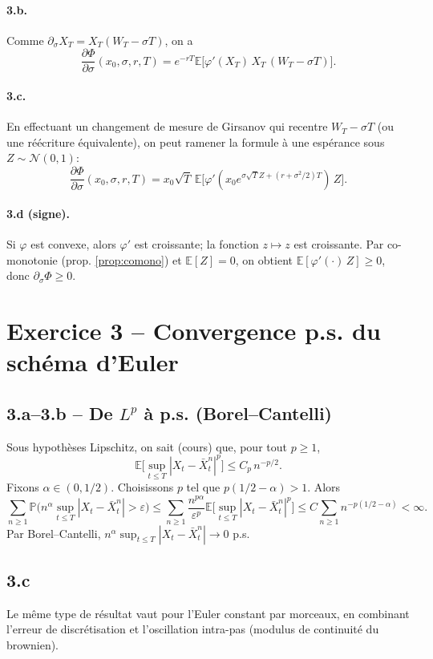 \documentclass[11pt,a4paper]{article}
\newcommand{\E}{\mathbb{E}}
\newcommand{\Pp}{\mathbb{P}}
\newcommand{\1}{\mathbbm{1}}
\theoremstyle{plain}
\theoremstyle{definition}
\begin{document}
\paragraph{3.b.}
Comme $\partial_\sigma X_T=X_T(W_T-\sigma T)$, on a
\[
\frac{\partial\Phi}{\partial\sigma}(x_0,\sigma,r,T)=e^{-rT}\E\big[\varphi'(X_T)\,X_T\,(W_T-\sigma T)\big].
\]
\paragraph{3.c.}
En effectuant un changement de mesure de Girsanov qui recentre $W_T-\sigma T$ (ou une réécriture équivalente), on peut ramener la formule à une espérance sous $Z\sim\mathcal N(0,1)$:
\[
\frac{\partial\Phi}{\partial\sigma}(x_0,\sigma,r,T)=x_0\sqrt{T}\,\E\big[\varphi'(x_0e^{\sigma\sqrt{T}Z+(r+\sigma^2/2)T})\,Z\big].
\]
\paragraph{3.d (signe).}
Si $\varphi$ est convexe, alors $\varphi'$ est croissante; la fonction $z\mapsto z$ est croissante.
Par co-monotonie (prop. \ref{prop:comono}) et $\E[Z]=0$, on obtient $\E[\varphi'(\cdot)\,Z]\ge 0$, donc \(\partial_\sigma\Phi\ge 0\).

\section{Exercice 3 -- Convergence p.s. du schéma d'Euler}
\subsection{3.a--3.b -- De $L^p$ à p.s. (Borel--Cantelli)}
Sous hypothèses Lipschitz, on sait (cours) que, pour tout $p\ge 1$,
\[
\E\Big[\sup_{t\le T}|X_t-\bar X_t^n|^p\Big]\le C_p\,n^{-p/2}.
\]
Fixons $\alpha\in(0,1/2)$. Choisissons $p$ tel que $p(1/2-\alpha)>1$. Alors
\[
\sum_{n\ge 1}\Pp\Big(n^\alpha\sup_{t\le T}|X_t-\bar X_t^n|>\varepsilon\Big)
\le \sum_{n\ge 1}\frac{n^{p\alpha}}{\varepsilon^p}\E\Big[\sup_{t\le T}|X_t-\bar X_t^n|^p\Big]
\le C\sum_{n\ge 1} n^{-p(1/2-\alpha)}<\infty.
\]
Par Borel--Cantelli, $n^\alpha\sup_{t\le T}|X_t-\bar X_t^n|\to 0$ p.s.
\subsection{3.c}
Le même type de résultat vaut pour l'Euler constant par morceaux, en combinant l'erreur de discrétisation et l'oscillation intra-pas (modulus de continuité du brownien).
\end{document}

